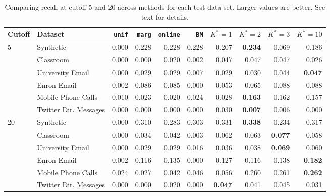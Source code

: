 \begin{table}[t]
\begin{center}
{\footnotesize
\begin{tabular}{llrrrrrrrr}
  \hline
Cutoff & Dataset & \texttt{unif} & \texttt{marg} & \texttt{online} & \texttt{BM} & $K^*=1$ & $K^*=2$ & $K^*=3$ & $K^*=10$ \\ 
  \hline
5 & Synthetic & 0.000 & 0.228 & 0.228 & 0.228 & 0.207 & \textbf{0.234} & 0.069 & 0.186 \\ 
   & Classroom & 0.000 & 0.000 & 0.020 & 0.002 & 0.047 & 0.047 & 0.047 & 0.026 \\ 
   & University Email & 0.000 & 0.029 & 0.029 & 0.007 & 0.029 & 0.030 & 0.044 & \textbf{0.047} \\ 
   & Enron Email & 0.002 & 0.086 & 0.085 & 0.000 & 0.053 & 0.065 & 0.088 & 0.088 \\ 
   & Mobile Phone Calls & 0.010 & 0.023 & 0.020 & 0.024 & 0.028 & \textbf{0.163} & 0.162 & 0.157 \\ 
   & Twitter Dir. Messages & 0.000 & 0.000 & 0.000 & 0.000 & 0.030 & \textbf{0.007} & 0.006 & 0.000 \\ 
  20 & Synthetic & 0.000 & 0.310 & 0.283 & 0.303 & 0.331 & \textbf{0.338} & 0.234 & 0.317 \\ 
   & Classroom & 0.000 & 0.034 & 0.042 & 0.003 & 0.062 & 0.063 & \textbf{0.077} & 0.058 \\ 
   & University Email & 0.000 & 0.029 & 0.029 & 0.016 & 0.036 & 0.038 & \textbf{0.069} & 0.060 \\ 
   & Enron Email & 0.002 & 0.116 & 0.135 & 0.000 & 0.127 & 0.116 & 0.138 & \textbf{0.182} \\ 
   & Mobile Phone Calls & 0.024 & 0.027 & 0.042 & 0.046 & 0.056 & 0.260 & 0.261 & \textbf{0.262} \\ 
   & Twitter Dir. Messages & 0.000 & 0.000 & 0.020 & 0.000 & \textbf{0.047} & 0.041 & 0.045 & 0.031 \\ 
   \hline
\end{tabular}
}
\caption{Comparing recall at cutoff 5 and 20 across methods for each test data set.  Larger values are better.  See text for details.}
\label{tab:recall20}
\end{center}
\end{table}
